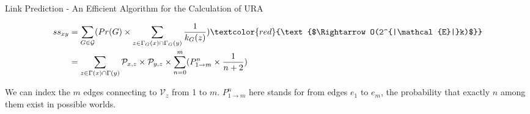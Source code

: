 \documentclass[9pt]{beamer}
\begin{document}












\begin{frame}{Link Prediction - An Efficient Algorithm for the Calculation of URA}

\begin{align*}
ss_{xy}&=\sum_{G\in \mathcal{G}}( Pr(G)\times\sum_{z\in \Gamma_G(x)\cap\Gamma_G(y)}\frac{1}{k_G(z)}) \textcolor{red}{\text{$\Rightarrow O(2^{|\mathcal{E}|}k)$}}\\
&=\sum_{z\in \Gamma(x)\cap\Gamma(y)}\mathcal{P}_{x,z}\times\mathcal{P}_{y,z} \times \sum_{n=0}^{m}(P_{1\rightarrow m}^n \times \frac{1}{n+2})
\end{align*}

We can index the $m$ edges connecting to $\mathcal{V}_z$ from 1 to $m$. $P_{1\rightarrow m}^n$ here stands for from edges $e_1$ to $e_m$, the probability that exactly $n$ among them exist in possible worlds.

\end{frame}
\end{document}
